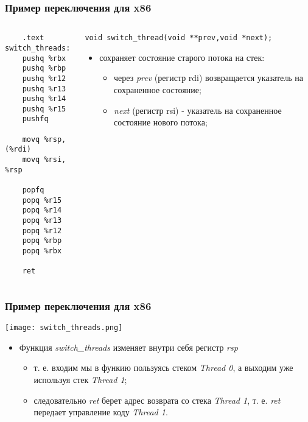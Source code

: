 \begin{frame}[fragile]
\frametitle{Пример переключения для x86}
\begin{columns}
  \begin{column}{0.4\linewidth}
    \begin{lstlisting}
    .text
switch_threads:
    pushq %rbx
    pushq %rbp
    pushq %r12
    pushq %r13
    pushq %r14
    pushq %r15
    pushfq

    movq %rsp, (%rdi)
    movq %rsi, %rsp

    popfq
    popq %r15
    popq %r14
    popq %r13
    popq %r12
    popq %rbp
    popq %rbx

    ret
    \end{lstlisting}
  \end{column}
  \begin{column}{0.6\linewidth}
    \begin{lstlisting}
void switch_thread(void **prev,void *next);
    \end{lstlisting}
    \begin{itemize}
      \item сохраняет состояние старого потока на стек:
      \begin{itemize}
        \item через \emph{prev} (регистр rdi) возвращается указатель на
        сохраненное состояние;
        \item \emph{next} (регистр rsi) - указатель на сохраненное состояние
        нового потока;
      \end{itemize}
    \end{itemize}
  \end{column}
\end{columns}
\end{frame}

\begin{frame}
\frametitle{Пример переключения для x86}
\begin{center}
  \texttt{[image: switch\_threads.png]}
\end{center}
\begin{itemize}
  \item Функция \emph{switch\_threads} изменяет внутри себя регистр \emph{rsp}
  \begin{itemize}
    \item т. е. входим мы в функию пользуясь стеком \emph{Thread 0}, а выходим
    уже используя стек \emph{Thread 1};
    \item следовательно \emph{ret} берет адрес возврата со стека
    \emph{Thread 1}, т. е. \emph{ret} передает управление коду \emph{Thread 1}.
  \end{itemize}
\end{itemize}
\end{frame}

